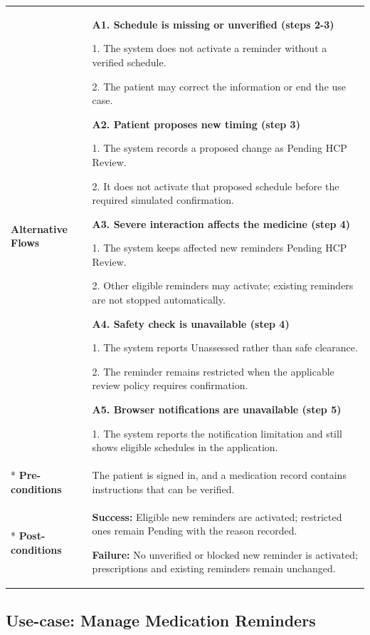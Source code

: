\begin{longtable}{|p{}|p{}|}
\hline
\textbf{Alternative Flows} &
\textbf{A1. Schedule is missing or unverified (steps 2-3)}\par
1. The system does not activate a reminder without a verified schedule.\par
2. The patient may correct the information or end the use case.
\par
\textbf{A2. Patient proposes new timing (step 3)}\par
1. The system records a proposed change as Pending HCP Review.\par
2. It does not activate that proposed schedule before the required simulated confirmation.
\par
\textbf{A3. Severe interaction affects the medicine (step 4)}\par
1. The system keeps affected new reminders Pending HCP Review.\par
2. Other eligible reminders may activate; existing reminders are not stopped automatically.
\par
\textbf{A4. Safety check is unavailable (step 4)}\par
1. The system reports Unassessed rather than safe clearance.\par
2. The reminder remains restricted when the applicable review policy requires confirmation.
\par
\textbf{A5. Browser notifications are unavailable (step 5)}\par
1. The system reports the notification limitation and still shows eligible schedules in the application.
\\* \hline
\textbf{Pre-conditions} & The patient is signed in, and a medication record contains instructions that can be verified. \\* \hline
\textbf{Post-conditions} & \textbf{Success:} Eligible new reminders are activated; restricted ones remain Pending with the reason recorded.\par
\textbf{Failure:} No unverified or blocked new reminder is activated; prescriptions and existing reminders remain unchanged. \\ \hline
\end{longtable}

\clearpage
\subsection{Use-case: Manage Medication Reminders}
\label{uc:uc-07}

